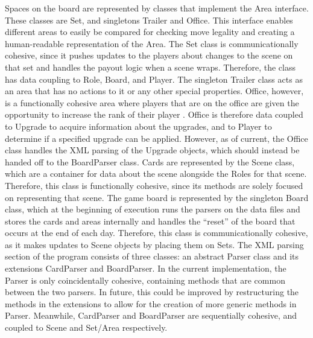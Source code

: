 \documentclass[letterpaper, twoside]{report}
\begin{document}
Spaces on the board are represented by classes that implement the Area interface. These classes are Set, and singletons Trailer and Office. This interface enables different areas to easily be compared for checking move legality and creating a human-readable representation of the Area.  The Set class is communicationally cohesive, since it pushes updates to the players about changes to the scene on that set and handles the payout logic when a scene wraps. Therefore, the class has data coupling to Role, Board, and Player.
The singleton Trailer class acts as an area that has no actions to it or any other special properties. Office, however, is a functionally cohesive area where players that are on the office are given the opportunity to increase the rank of their player . Office is therefore data coupled to Upgrade to acquire information about the upgrades, and to Player to determine if a specified upgrade can be applied. However, as of current, the Office class handles the XML parsing of the Upgrade objects, which should instead be handed off to the BoardParser class.
Cards are represented by the Scene class, which are a container for data about the scene alongside the Roles for that scene. Therefore, this class is functionally cohesive, since its methods are solely focused on representing that scene.
The game board is represented by the singleton Board class, which at the beginning of execution runs the parsers on the data files and stores the cards and areas internally and handles the “reset” of the board that occurs at the end of each day. Therefore, this class is communicationally cohesive, as it makes updates to Scene objects by placing them on Sets.
The XML parsing section of the program consists of three classes: an abstract Parser class and its extensions CardParser and BoardParser. In the current implementation, the Parser is only coincidentally cohesive, containing methods that are common between the two parsers. In future, this could be improved by restructuring the methods in the extensions to allow for the creation of more generic methods in Parser. Meanwhile, CardParser and BoardParser are sequentially cohesive, and coupled to Scene and Set/Area respectively.
\end{document}

